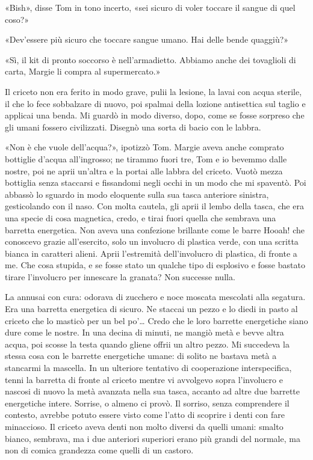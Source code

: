 «Bish», disse Tom in tono incerto, «sei sicuro di voler toccare il
sangue di quel coso?»

«Dev'essere più sicuro che toccare sangue umano. Hai delle bende
quaggiù?»

«Sì, il kit di pronto soccorso è nell'armadietto. Abbiamo anche dei
tovaglioli di carta, Margie li compra al supermercato.»

Il criceto non era ferito in modo grave, pulii la lesione, la lavai con
acqua sterile, il che lo fece sobbalzare di nuovo, poi spalmai della
lozione antisettica sul taglio e applicai una benda. Mi guardò in modo
diverso, dopo, come se fosse sorpreso che gli umani fossero civilizzati.
Disegnò una sorta di bacio con le labbra.

«Non è che vuole dell'acqua?», ipotizzò Tom. Margie aveva anche comprato
bottiglie d'acqua all'ingrosso; ne tirammo fuori tre, Tom e io bevemmo
dalle nostre, poi ne aprii un'altra e la portai alle labbra del criceto.
Vuotò mezza bottiglia senza staccarsi e fissandomi negli occhi in un
modo che mi spaventò. Poi abbassò lo sguardo in modo eloquente sulla sua
tasca anteriore sinistra, gesticolando con il naso. Con molta cautela,
gli aprii il lembo della tasca, che era una specie di cosa magnetica,
credo, e tirai fuori quella che sembrava una barretta energetica. Non
aveva una confezione brillante come le barre Hooah! che conoscevo grazie
all'esercito, solo un involucro di plastica verde, con una scritta
bianca in caratteri alieni. Aprii l'estremità dell'involucro di
plastica, di fronte a me. Che cosa stupida, e se fosse stato un qualche
tipo di esplosivo e fosse bastato tirare l'involucro per innescare la
granata? Non successe nulla.

La annusai con cura: odorava di zucchero e noce moscata mescolati alla
segatura. Era una barretta energetica di sicuro. Ne staccai un pezzo e
lo diedi in pasto al criceto che lo masticò per un bel po'\ldots{} Credo
che le loro barrette energetiche siano dure come le nostre. In una
decina di minuti, ne mangiò metà e bevve altra acqua, poi scosse la
testa quando gliene offrii un altro pezzo. Mi succedeva la stessa cosa
con le barrette energetiche umane: di solito ne bastava metà a stancarmi
la mascella. In un ulteriore tentativo di cooperazione interspecifica,
tenni la barretta di fronte al criceto mentre vi avvolgevo sopra
l'involucro e nascosi di nuovo la metà avanzata nella sua tasca, accanto
ad altre due barrette energetiche intere. Sorrise, o almeno ci provò. Il
sorriso, senza comprendere il contesto, avrebbe potuto essere visto come
l'atto di scoprire i denti con fare minaccioso. Il criceto aveva denti
non molto diversi da quelli umani: smalto bianco, sembrava, ma i due
anteriori superiori erano più grandi del normale, ma non di comica
grandezza come quelli di un castoro.

